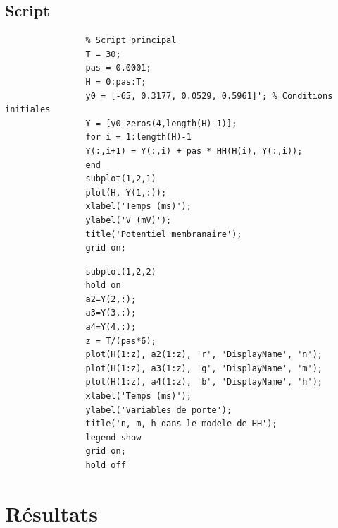\subsection{Script}
		\begin{center}
			\begin{minipage}{0.49\textwidth}
				\begin{lstlisting}
				% Script principal 
				T = 30;
				pas = 0.0001;
				H = 0:pas:T;
				y0 = [-65, 0.3177, 0.0529, 0.5961]'; % Conditions initiales
				Y = [y0 zeros(4,length(H)-1)];
				for i = 1:length(H)-1
				Y(:,i+1) = Y(:,i) + pas * HH(H(i), Y(:,i));
				end
				subplot(1,2,1)
				plot(H, Y(1,:));
				xlabel('Temps (ms)');
				ylabel('V (mV)');
				title('Potentiel membranaire');
				grid on;
				\end{lstlisting}
			\end{minipage}%
			\hfill
			\begin{minipage}{0.49\textwidth}
				\begin{lstlisting}
				subplot(1,2,2)
				hold on
				a2=Y(2,:);
				a3=Y(3,:);
				a4=Y(4,:);
				z = T/(pas*6);
				plot(H(1:z), a2(1:z), 'r', 'DisplayName', 'n');
				plot(H(1:z), a3(1:z), 'g', 'DisplayName', 'm');
				plot(H(1:z), a4(1:z), 'b', 'DisplayName', 'h');
				xlabel('Temps (ms)');
				ylabel('Variables de porte');
				title('n, m, h dans le modele de HH');
				legend show
				grid on;
				hold off
				\end{lstlisting}
			\end{minipage}
		\end{center}
\section{Résultats}
